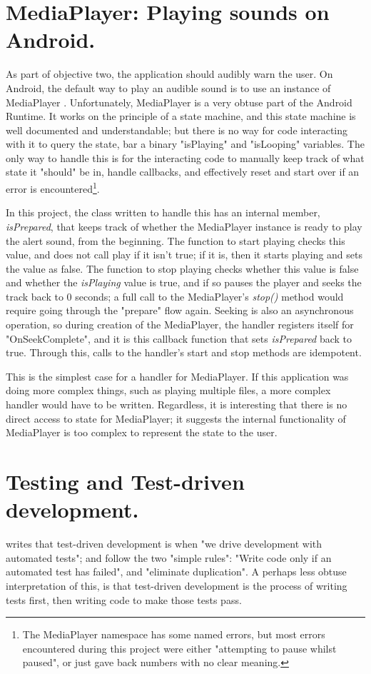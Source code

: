 \documentclass[11pt, a4paper, notitlepage]{report}
\begin{document}
\section{MediaPlayer: Playing sounds on Android.}
As part of objective two, the application should audibly warn the user. On Android, the default way to play an audible sound is to use an instance of MediaPlayer \citep{mediaPlayerAndroid}. Unfortunately, MediaPlayer is a very obtuse part of the Android Runtime. It works on the principle of a state machine, and this state machine is well documented and understandable; but there is no way for code interacting with it to query the state, bar a binary "isPlaying" and "isLooping" variables. The only way to handle this is for the interacting code to manually keep track of what state it "should" be in, handle callbacks, and effectively reset and start over if an error is encountered\footnote{The MediaPlayer namespace has some named errors, but most errors encountered during this project were either "attempting to pause whilst paused", or just gave back numbers with no clear meaning.}.

In this project, the class written to handle this has an internal member, \textit{isPrepared}, that keeps track of whether the MediaPlayer instance is ready to play the alert sound, from the beginning. The function to start playing checks this value, and does not call play if it isn't true; if it is, then it starts playing and sets the value as false. The function to stop playing checks whether this value is false and whether the \textit{isPlaying} value is true, and if so pauses the player and seeks the track back to 0 seconds; a full call to the MediaPlayer's \textit{stop()} method would require going through the "prepare" flow again. Seeking is also an asynchronous operation, so during creation of the MediaPlayer, the handler registers itself for "OnSeekComplete", and it is this callback function that sets \textit{isPrepared} back to true. Through this, calls to the handler's start and stop methods are idempotent.

This is the simplest case for a handler for MediaPlayer. If this application was doing more complex things, such as playing multiple files, a more complex handler would have to be written. Regardless, it is interesting that there is no direct access to state for MediaPlayer; it suggests the internal functionality of MediaPlayer is too complex to represent the state to the user.

\section{Testing and Test-driven development.}\label{sec:TDD}
\citet{tddByExample} writes that test-driven development is when "we drive development with automated tests"; and follow the two "simple rules": "Write code only if an automated test has failed", and "eliminate duplication". A perhaps less obtuse interpretation of this, is that test-driven development is the process of writing tests first, then writing code to make those tests pass.
\end{document}

